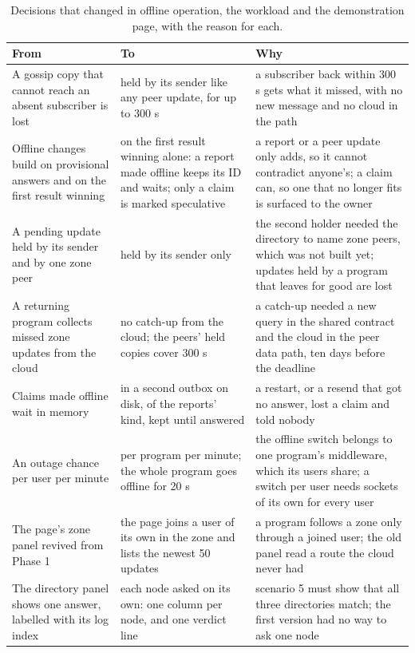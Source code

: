 \begin{table}[!htb]
\centering\small
\caption{Decisions that changed in offline operation, the workload and the demonstration page, with the reason for each.}
\label{tab:changed2}
\begin{tabularx}{\linewidth}{@{}P{3.9cm}P{4.1cm}L@{}}
\toprule
From & To & Why \\
\midrule
A gossip copy that cannot reach an absent subscriber is lost & held by its sender like any peer update, for up to 300 s & a subscriber back within 300 s gets what it missed, with no new message and no cloud in the path \\ %
Offline changes build on provisional answers and on the first result winning & on the first result winning alone: a report made offline keeps its ID and waits; only a claim is marked speculative & a report or a peer update only adds, so it cannot contradict anyone's; a claim can, so one that no longer fits is surfaced to the owner \\ %
A pending update held by its sender and by one zone peer & held by its sender only & the second holder needed the directory to name zone peers, which was not built yet; updates held by a program that leaves for good are lost \\ %
A returning program collects missed zone updates from the cloud & no catch-up from the cloud; the peers' held copies cover 300 s & a catch-up needed a new query in the shared contract and the cloud in the peer data path, ten days before the deadline \\ %
Claims made offline wait in memory & in a second outbox on disk, of the reports' kind, kept until answered & a restart, or a resend that got no answer, lost a claim and told nobody \\ %
An outage chance per user per minute & per program per minute; the whole program goes offline for 20 s & the offline switch belongs to one program's middleware, which its users share; a switch per user needs sockets of its own for every user \\ %
The page's zone panel revived from Phase 1 & the page joins a user of its own in the zone and lists the newest 50 updates & a program follows a zone only through a joined user; the old panel read a route the cloud never had \\ %
The directory panel shows one answer, labelled with its log index & each node asked on its own: one column per node, and one verdict line & scenario 5 must show that all three directories match; the first version had no way to ask one node \\ %

\end{tabularx}
\end{table}
